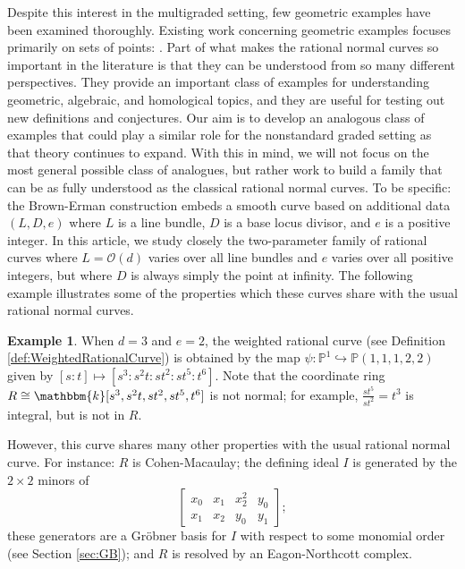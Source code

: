 \documentclass[12pt,reqno]{amsart}
\theoremstyle{definition}
\newtheorem{example}[theorem]{Example}
\theoremstyle{remark}
\newcommand{\bbk}{\mathbbm{k}}
\newcommand{\calO}{{\mathcal{O}}}
\begin{document}
Despite this interest in the multigraded setting, few geometric examples have been examined thoroughly.  Existing work concerning geometric examples focuses primarily on sets of points: \cite{hnvVirtualResPoints,svMultigradedRegSyzygiesFatPoints}.  Part of what makes the rational normal curves so important in the literature is that they can be understood from so many different perspectives. They provide an important class of examples for understanding geometric, algebraic, and homological topics, and they are useful
for testing out new definitions and conjectures. Our aim is to develop an analogous class of examples that could play a similar role for the nonstandard graded setting as that theory continues to expand.  With this in mind, we will not focus on the most general possible class of analogues, but rather work to build a family that can be as fully understood as the classical rational normal curves. To be specific:  the Brown-Erman construction embeds a smooth curve based on additional data $(L,D,e)$ where $L$ is a line bundle, $D$ is a base locus divisor, and $e$ is a positive integer. In this article, we study closely the two-parameter family of rational curves where $L=\calO(d)$ varies over all line bundles and $e$ varies over all positive integers, but where $D$ is always simply the point at infinity. The following example illustrates some of the properties which these curves share with the usual rational normal curves.



\begin{example}
\label{ex:d3e2}
    When $d=3$ and $e=2$, the weighted rational curve (see Definition \ref{def:WeightedRationalCurve}) is obtained by the map $\psi: \mathbb P^1 \hookrightarrow \mathbb P(1,1,1,2,2)$ given by $[s:t] \mapsto [s^3:s^2t:st^2:st^5:t^6]$.  Note that the coordinate ring $R \cong \bbk[s^3,s^2t,st^2,st^5,t^6]$ is not normal; for example, $\frac{st^5}{st^2} = t^3$ is integral, but is not in $R$.
    
    However, this curve shares many other properties with the usual rational normal curve.  For instance: $R$ is Cohen-Macaulay; the defining ideal $I$ is generated by the $2\times 2$ minors of
        \[
        \begin{bmatrix} x_0 & x_1 & x_2^2 & y_0 \\ x_1 & x_2 & y_0 & y_1 \end{bmatrix};
        \]
    these generators are a Gr\"obner basis for $I$ with respect to some monomial order (see Section \ref{sec:GB}); and $R$ is resolved by an Eagon-Northcott complex.  
\end{example}
\end{document}
